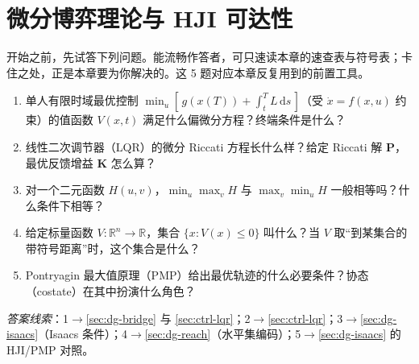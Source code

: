 \chapter{微分博弈理论与 HJI 可达性}
\label{ch:plan-diffgame}


\begin{practice}[前置自测]
开始之前，先试答下列问题。能流畅作答者，可只速读本章的速查表与符号表；卡住之处，正是本章要为你解决的。这 5 题对应本章反复用到的前置工具。
\begin{enumerate}
  \item 单人有限时域最优控制 $\min_u[\,g(x(T))+\int_t^T L\,\mathrm ds\,]$（受 $\dot x=f(x,u)$ 约束）的值函数 $V(x,t)$ 满足什么偏微分方程？终端条件是什么？
  \item 线性二次调节器（LQR）的微分 Riccati 方程长什么样？给定 Riccati 解 $\mathbf P$，最优反馈增益 $\mathbf K$ 怎么算？
  \item 对一个二元函数 $H(u,v)$，$\min_u\max_v H$ 与 $\max_v\min_u H$ 一般相等吗？什么条件下相等？
  \item 给定标量函数 $V:\mathbb{R}^n\to\mathbb{R}$，集合 $\{x:V(x)\le 0\}$ 叫什么？当 $V$ 取“到某集合的带符号距离”时，这个集合是什么？
  \item Pontryagin 最大值原理（PMP）给出最优轨迹的什么必要条件？协态（costate）在其中扮演什么角色？
\end{enumerate}
\noindent\emph{答案线索}：1$\to$\cref{sec:dg-bridge} 与 \cref{sec:ctrl-lqr}；2$\to$\cref{sec:ctrl-lqr}；3$\to$\cref{sec:dg-isaacs}（Isaacs 条件）；4$\to$\cref{sec:dg-reach}（水平集编码）；5$\to$\cref{sec:dg-isaacs} 的 HJI/PMP 对照。
\end{practice}

